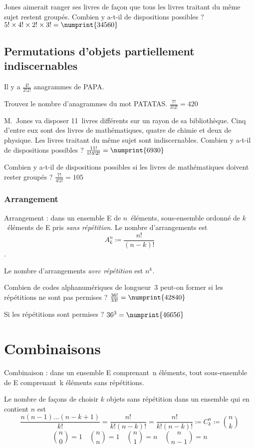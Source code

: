 \noindent Jones aimerait ranger ses livres de façon que tous les livres traitant du même sujet restent groupés. Combien y a-t-il de dispositions possibles ?
 $5! \times 4! \times 2! \times 3! = \numprint{34560}$


\subsection{Permutations d’objets partiellement indiscernables}
Il y a $\frac{4!}{2!2!}$ anagrammes de PAPA.

 Trouvez le nombre d’anagrammes du mot PATATAS.
 $\frac{7!}{3!2!} = 420$

 M.~Jones va disposer 11~livres différents sur un rayon de sa bibliothèque. Cinq d’entre eux sont des livres de mathématiques, quatre de chimie et deux de physique. Les livres traitant du même sujet sont indiscernables. Combien y a-t-il de dispositions possibles ?
\sol $\frac{11!}{5!4!2!} = \numprint{6930}$

\noindent Combien y a-t-il de dispositions possibles si les livres de mathématiques doivent rester groupés ?
\sol $\frac{7!}{4!2!} = 105$

\subsubsection{Arrangement}
Arrangement : dans un ensemble E de $n$~éléments, sous-ensemble ordonné de $k$~éléments de E pris \emph{sans répétition}. Le nombre d’arrangements est \[A_k^n \coloneqq \frac{n!}{(n-k)!}\].

Le nombre d’arrangements \emph{avec répétition} est $n^k$.

 Combien de codes alphanumériques de longueur~3 peut-on former si les répétitions ne sont pas permises ?
\sol $\frac{36!}{33!} = \numprint{42840}$

\noindent Si les répétitions sont permises ?
\sol $36^3 = \numprint{46656}$



\section{Combinaisons}

Combinaison : dans un ensemble E comprenant n éléments, tout sous-ensemble de E comprenant k éléments sans répétitions.

Le nombre de façons de choisir $k$ objets sans répétition dans un ensemble qui en contient $n$ est 
\[\frac{n(n-1)\dots(n-k+1)}{k!} = \frac{n!}{k!(n-k)!} = \frac{n!}{k!(n-k)!} \coloneqq C_k^n \coloneqq \binom{n}{k}
\] 
\[\binom{n}{0} = 1 \quad \binom{n}{n} = 1 \quad \binom{n}{1} = n \quad \binom{n}{n-1} = n\]

